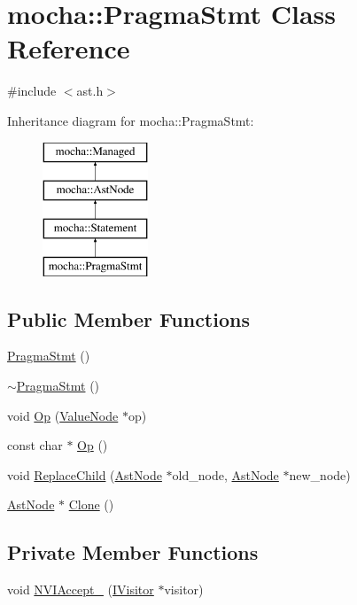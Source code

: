 \hypertarget{classmocha_1_1_pragma_stmt}{
\section{mocha::PragmaStmt Class Reference}
\label{classmocha_1_1_pragma_stmt}
}


{\ttfamily \#include $<$ast.h$>$}

Inheritance diagram for mocha::PragmaStmt:\begin{figure}[H]
\begin{center}
\leavevmode
\includegraphics[height=4.000000cm]{classmocha_1_1_pragma_stmt}
\end{center}
\end{figure}
\subsection*{Public Member Functions}
\begin{DoxyCompactItemize}
\item 
\hyperlink{classmocha_1_1_pragma_stmt_a4e95dbd306bc2d23dfd3ad92934e9a8b}{PragmaStmt} ()
\item 
\hyperlink{classmocha_1_1_pragma_stmt_a45b12b2600bbab094a0d7a907536699a}{$\sim$PragmaStmt} ()
\item 
void \hyperlink{classmocha_1_1_pragma_stmt_ad727929fd2a6a54e44a62153f1f8dd55}{Op} (\hyperlink{classmocha_1_1_value_node}{ValueNode} $\ast$op)
\item 
const char $\ast$ \hyperlink{classmocha_1_1_pragma_stmt_aaa7c4e5bbdbd10c0f8ff050c7d4af1c2}{Op} ()
\item 
void \hyperlink{classmocha_1_1_pragma_stmt_adcec172990985fd54626dcb6ca678814}{ReplaceChild} (\hyperlink{classmocha_1_1_ast_node}{AstNode} $\ast$old\_\-node, \hyperlink{classmocha_1_1_ast_node}{AstNode} $\ast$new\_\-node)
\item 
\hyperlink{classmocha_1_1_ast_node}{AstNode} $\ast$ \hyperlink{classmocha_1_1_pragma_stmt_a8d30157075d527cf95d801e1733870ed}{Clone} ()
\end{DoxyCompactItemize}
\subsection*{Private Member Functions}
\begin{DoxyCompactItemize}
\item 
void \hyperlink{classmocha_1_1_pragma_stmt_aeb08affe7141887bfc88f44c49dfea4e}{NVIAccept\_\-} (\hyperlink{classmocha_1_1_i_visitor}{IVisitor} $\ast$visitor)
\end{DoxyCompactItemize}
